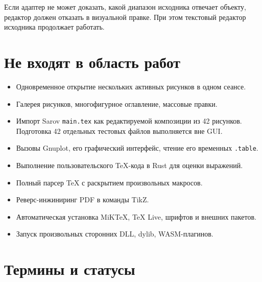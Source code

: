 \documentclass[11pt,a4paper,oneside]{scrreprt}
\providecommand{\tightlist}{\setlength{\itemsep}{0pt}\setlength{\parskip}{0pt}}
\begin{document}
Если адаптер не может доказать, какой диапазон исходника отвечает объекту, редактор должен отказать в визуальной правке. При этом текстовый редактор исходника продолжает работать.

\section{Не входят в область работ}\label{ux43dux435-ux432ux445ux43eux434ux44fux442-ux432-ux43eux431ux43bux430ux441ux442ux44c-ux440ux430ux431ux43eux442}

\begin{itemize}
\tightlist
\item
  Одновременное открытие нескольких активных рисунков в одном сеансе.
\item
  Галерея рисунков, многофигурное оглавление, массовые правки.
\item
  Импорт Sarov \texttt{main.tex} как редактируемой композиции из 42 рисунков. Подготовка 42 отдельных тестовых файлов выполняется вне GUI.
\item
  Вызовы Gnuplot, его графический интерфейс, чтение его временных \texttt{.table}.
\item
  Выполнение пользовательского TeX-кода в Rust для оценки выражений.
\item
  Полный парсер TeX с раскрытием произвольных макросов.
\item
  Реверс-инжиниринг PDF в команды TikZ.
\item
  Автоматическая установка MiKTeX, TeX Live, шрифтов и внешних пакетов.
\item
  Запуск произвольных сторонних DLL, dylib, WASM-плагинов.
\end{itemize}

\section{Термины и статусы}\label{ux442ux435ux440ux43cux438ux43dux44b-ux438-ux441ux442ux430ux442ux443ux441ux44b}
\end{document}
